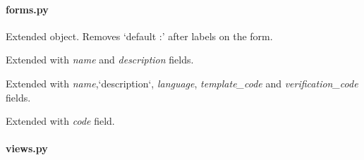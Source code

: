 \documentclass[letterpaper,10pt,english]{sphinxmanual}
\begin{document}
\paragraph{forms.py}
\label{web_portal:forms-py}

\begin{fulllineitems}
\label{web_portal:core.courses.forms.SiteForm}
Extended  object. Removes `default :' after labels on the
form.

\end{fulllineitems}


\begin{fulllineitems}
\label{web_portal:core.courses.forms.CourseForm}
Extended  with \emph{name} and \emph{description} fields.

\end{fulllineitems}


\begin{fulllineitems}
\label{web_portal:core.courses.forms.AssignmentForm}
Extended  with \emph{name},{}`description{}`, \emph{language},
\emph{template\_code} and \emph{verification\_code} fields.

\end{fulllineitems}


\begin{fulllineitems}
\label{web_portal:core.courses.forms.SolutionForm}
Extended  with \emph{code} field.

\end{fulllineitems}



\paragraph{views.py}
\label{web_portal:views-py}
\end{document}
